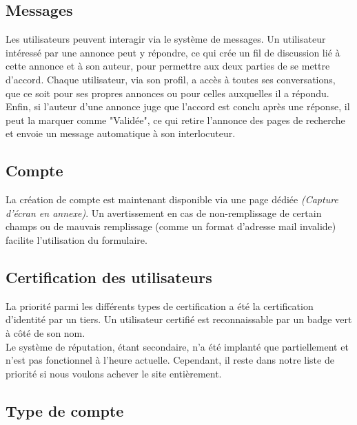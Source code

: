 \documentclass[a4paper,11pt]{article}
\begin{document}
\subsection{Messages}

Les utilisateurs peuvent interagir via le système de messages. Un utilisateur intéressé par une annonce peut y répondre, ce qui crée un fil de discussion lié à cette annonce et à son auteur, pour permettre aux deux parties de se mettre d'accord. Chaque utilisateur, via son profil, a accès à toutes ses conversations, que ce soit pour ses propres annonces ou pour celles auxquelles il a répondu. Enfin, si l'auteur d'une annonce juge que l'accord est conclu après une réponse, il peut la marquer comme "Validée", ce qui retire l'annonce des pages de recherche et envoie un message automatique à son interlocuteur.


\subsection{Compte}

La création de compte est maintenant disponible via une page dédiée \textit{(Capture d'écran en annexe)}. Un avertissement en cas de non-remplissage de certain champs ou de mauvais remplissage (comme un format d'adresse mail invalide) facilite l'utilisation du formulaire.



\subsection{Certification des utilisateurs}

La priorité parmi les différents types de certification a été la certification d'identité par un tiers. Un utilisateur certifié est reconnaissable par un badge vert à côté de son nom.\\

Le système de réputation, étant secondaire, n'a été implanté que partiellement et n'est pas fonctionnel à l'heure actuelle. Cependant, il reste dans notre liste de priorité si nous voulons achever le site entièrement.



\subsection{Type de compte}
\end{document}
